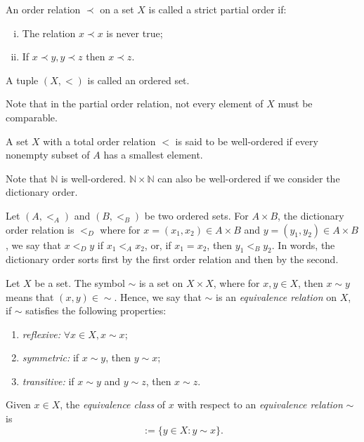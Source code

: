 \begin{definition}
  An order relation $\prec$ on a set $X$ is called a strict partial order if:
	\begin{enumerate}[(i)]
		\item The relation $x \prec x$ is never true;
		\item If $x \prec y, y \prec z$ then $x \prec z$.
	\end{enumerate}
	A tuple $(X, <)$ is called an ordered set.
\end{definition}
Note that in the partial order relation, not every element of $X$
must be comparable.

\begin{definition}
  A set $X$ with a total order relation $<$ is said to be well-ordered
  if every nonempty subset of $A$ has a smallest element.
\end{definition}

Note that $\mathbb N$ is well-ordered. $\mathbb N \times \mathbb N$ can
also be well-ordered if we consider the dictionary order.
\begin{definition}
  Let $(A, <_A)$ and $(B, <_B)$ be two ordered sets. For $A \times B$,
  the dictionary order relation is $<_D$ where for $x=(x_1,x_2) \in A\times B$ and
  $y = (y_1,y_2) \in A\times B$,
  we say that $x <_D y$ if $x_1 <_A x_2$, or, if $x_1 = x_2$, then $y_1 <_B y_2$.
  In words, the dictionary order sorts first by the first order relation and then
  by the second.
\end{definition}

\begin{definition}
	Let $X$ be a set. The symbol $\sim$ is a set on $X \times X$, where
	for $x,y \in X$, then $x \sim y$ means that $(x,y) \in \sim$. Hence,
	we say that $\sim$ is an \textit{equivalence relation} on $X$, if $\sim$ satisfies
	the following properties:
	\begin{enumerate}
		\item \textit{reflexive:} $\forall x \in X, x \sim x$;
		\item \textit{symmetric:} if $x \sim y$, then $y \sim x$;
		\item \textit{transitive:} if $x \sim y$ and $y \sim z$, then $x \sim z$.
	\end{enumerate}
\end{definition}

\begin{definition}
	Given $x \in X$, the \textit{equivalence class} of $x$ with respect
	to an \textit{equivalence relation} $\sim$ is
	\begin{equation}
		[x]:=\{
		y \in X: y \sim x
		\}.
		\label{eq:eqclass}
	\end{equation}
\end{definition}

